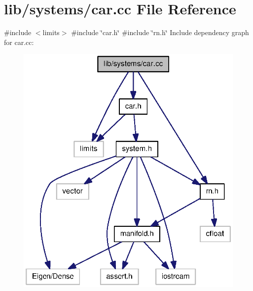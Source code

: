 \section{lib/systems/car.cc \-File \-Reference}
\label{car_8cc}
{\ttfamily \#include $<$limits$>$}\*
{\ttfamily \#include \char`\"{}car.\-h\char`\"{}}\*
{\ttfamily \#include \char`\"{}rn.\-h\char`\"{}}\*
\-Include dependency graph for car.\-cc\-:\nopagebreak
\begin{figure}[H]
\begin{center}
\leavevmode
\includegraphics[width=322pt]{car_8cc__incl}
\end{center}
\end{figure}
